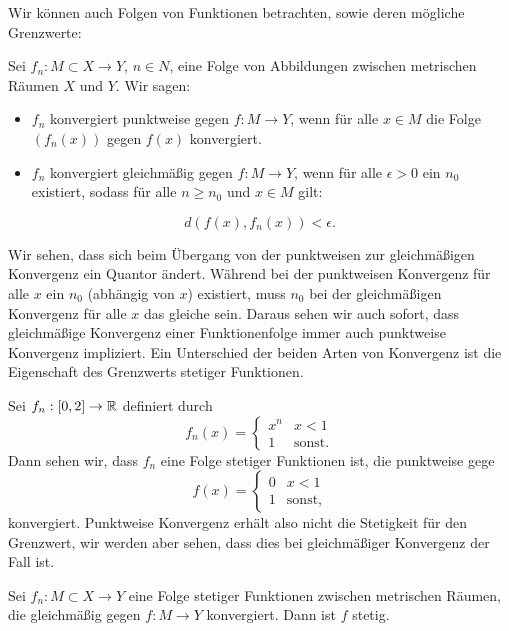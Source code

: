 Wir können auch Folgen von Funktionen betrachten, sowie deren mögliche Grenzwerte:
\label{stetigkeit/glm:definition-3}
\begin{definition}{}{}



Sei \(f_n: M \subset X \rightarrow Y\), \(n \in N\), eine Folge von Abbildungen zwischen metrischen Räumen \(X\) und \(Y\). Wir sagen:
\begin{itemize}
\item {} 
\(f_n\) konvergiert punktweise gegen \(f: M \rightarrow Y\), wenn für alle \(x \in M\) die Folge \((f_n(x))\) gegen \(f(x)\) konvergiert.

\item {} 
\(f_n\) konvergiert gleichmäßig gegen \(f: M \rightarrow Y\), wenn für alle \(\epsilon > 0\) ein \(n_0\) existiert, sodass für alle \(n \geq n_0\) und \(x \in M\) gilt:

\end{itemize}
\begin{equation*}
 d(f(x),f_n(x)) < \epsilon.
\end{equation*}\end{definition}

Wir sehen, dass sich beim Übergang von der punktweisen zur gleichmäßigen Konvergenz ein Quantor ändert. Während bei der punktweisen Konvergenz für alle \(x\) ein \(n_0\) (abhängig von \(x\)) existiert, muss \(n_0\) bei der gleichmäßigen Konvergenz für alle \(x\) das gleiche sein. Daraus sehen wir auch sofort, dass gleichmäßige Konvergenz einer Funktionenfolge immer auch punktweise Konvergenz impliziert.
Ein Unterschied der beiden Arten von Konvergenz ist die Eigenschaft des Grenzwerts stetiger Funktionen.
\label{stetigkeit/glm:example-4}
\begin{example}{}{}



Sei \(f_n: [0,2] \rightarrow \mathbb{R}\) definiert durch
\begin{equation*}
 f_n(x) = \left\{ \begin{matrix} x^n & x < 1 \\ 1 & \text{sonst.} \end{matrix} \right.
\end{equation*}
Dann sehen wir, dass \(f_n\) eine Folge stetiger Funktionen ist, die punktweise gege
\begin{equation*}
 f (x) = \left\{ \begin{matrix} 0 & x < 1 \\ 1 & \text{sonst,} \end{matrix} \right.
\end{equation*}
konvergiert. Punktweise Konvergenz erhält also nicht die Stetigkeit für den Grenzwert, wir werden aber sehen, dass dies bei gleichmäßiger Konvergenz der Fall ist.
\end{example}
\label{stetigkeit/glm:theorem-5}
\begin{theorem}{}{}



Sei \(f_n: M \subset X \rightarrow Y\) eine Folge stetiger Funktionen zwischen metrischen Räumen, die gleichmäßig gegen \(f: M \rightarrow Y\) konvergiert. Dann ist \(f\) stetig.
\end{theorem}

